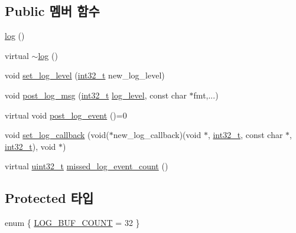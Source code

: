 \subsection*{Public 멤버 함수}
\begin{DoxyCompactItemize}
\item 
\hyperlink{classavdecc__lib_1_1log_a5e06d9b7f0033278f40a41d081efbe71}{log} ()
\item 
virtual \hyperlink{classavdecc__lib_1_1log_a3dfd5bb2604561657b7180b8feb81a8d}{$\sim$log} ()
\item 
void \hyperlink{classavdecc__lib_1_1log_ad2416d14295c0883c8b0f13cf36fe1db}{set\+\_\+log\+\_\+level} (\hyperlink{parse_8c_a37994e3b11c72957c6f454c6ec96d43d}{int32\+\_\+t} new\+\_\+log\+\_\+level)
\item 
void \hyperlink{classavdecc__lib_1_1log_a68139a6297697e4ccebf36ccfd02e44a}{post\+\_\+log\+\_\+msg} (\hyperlink{parse_8c_a37994e3b11c72957c6f454c6ec96d43d}{int32\+\_\+t} \hyperlink{classavdecc__lib_1_1log_aa07e39131a3e0ab9ffd691b0f455134d}{log\+\_\+level}, const char $\ast$fmt,...)
\item 
virtual void \hyperlink{classavdecc__lib_1_1log_a2897e19ed8bde731a37c566aa6a57084}{post\+\_\+log\+\_\+event} ()=0
\item 
void \hyperlink{classavdecc__lib_1_1log_aef98fd4c6cbf5e3b68b83380d43a9cd3}{set\+\_\+log\+\_\+callback} (void($\ast$new\+\_\+log\+\_\+callback)(void $\ast$, \hyperlink{parse_8c_a37994e3b11c72957c6f454c6ec96d43d}{int32\+\_\+t}, const char $\ast$, \hyperlink{parse_8c_a37994e3b11c72957c6f454c6ec96d43d}{int32\+\_\+t}), void $\ast$)
\item 
virtual \hyperlink{parse_8c_a6eb1e68cc391dd753bc8ce896dbb8315}{uint32\+\_\+t} \hyperlink{classavdecc__lib_1_1log_a5410f956bf04b4ce1376739f73667014}{missed\+\_\+log\+\_\+event\+\_\+count} ()
\end{DoxyCompactItemize}
\subsection*{Protected 타입}
\begin{DoxyCompactItemize}
\item 
enum \{ \hyperlink{classavdecc__lib_1_1log_adf764cbdea00d65edcd07bb9953ad2b7a46b4b58fe7f3d2ff3dc4e8f781261727}{L\+O\+G\+\_\+\+B\+U\+F\+\_\+\+C\+O\+U\+NT} = 32
 \}
\end{DoxyCompactItemize}
